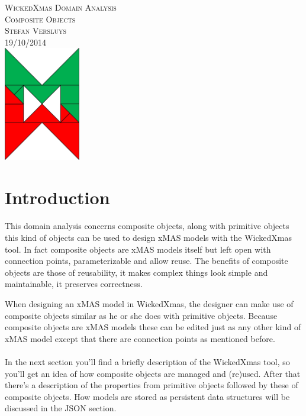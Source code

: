 \documentclass[a4paper,11pt,final]{article}
\begin{document}
\begin{titlepage}
	\vspace*{\fill}
	\begin{center}
		\textsc{\large WickedXmas Domain Analysis}\\[0.5cm]
		\textsc{\huge Composite Objects}\\[0.5cm]
		\textsc{Stefan Versluys}\\ \textsc{\scriptsize 19/10/2014}\\[2.0cm]
		\includegraphics[width=0.25\textwidth]{wXm}
	\end{center}
	\vspace*{\fill}
\end{titlepage}


\tableofcontents

\newpage

\section{Introduction}
\paragraph{}
This domain analysis concerns composite objects,
along with primitive objects this kind of objects can be used to design xMAS
models with the WickedXmas tool. In fact composite objects are xMAS models
itself but left open with connection points, parameterizable and allow reuse.
The benefits of composite objects are those of reusability, it makes complex
things look simple and maintainable, it preserves correctness.

When designing an xMAS model in WickedXmas, the designer can make use of
composite objects similar as he or she does with primitive objects. Because
composite objects are xMAS models these can be edited just as any other kind
of xMAS model except that there are connection points as mentioned before.

\paragraph{}
In the next section you'll find a briefly description of the WickedXmas tool,
so you'll get an idea of how composite objects are managed and (re)used.
After that there's a description of the properties from primitive objects
followed by these of composite objects.
How models are stored as persistent data structures will be discussed in
the JSON section.
\end{document}
